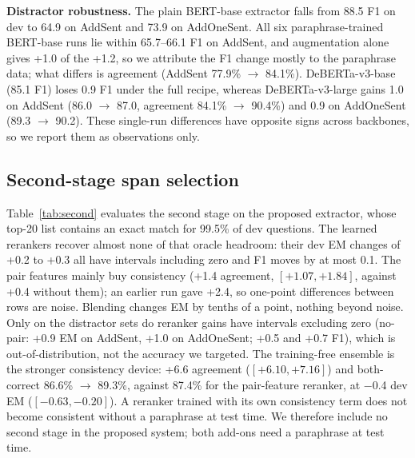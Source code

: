 \documentclass[11pt]{article}
\begin{document}
\textbf{Distractor robustness.} The plain BERT-base extractor falls from 88.5 F1 on dev to 64.9 on AddSent and 73.9 on AddOneSent. All six paraphrase-trained BERT-base runs lie within 65.7--66.1 F1 on AddSent, and augmentation alone gives +1.0 of the +1.2, so we attribute the F1 change mostly to the paraphrase data; what differs is agreement (AddSent 77.9\% $\rightarrow$ 84.1\%). DeBERTa-v3-base (85.1 F1) loses 0.9 F1 under the full recipe, whereas DeBERTa-v3-large gains 1.0 on AddSent (86.0 $\rightarrow$ 87.0, agreement 84.1\% $\rightarrow$ 90.4\%) and 0.9 on AddOneSent (89.3 $\rightarrow$ 90.2). These single-run differences have opposite signs across backbones, so we report them as observations only.



\subsection{Second-stage span selection}
\label{sec:second}
Table~\ref{tab:second} evaluates the second stage on the proposed extractor, whose top-20 list contains an exact match for 99.5\% of dev questions. The learned rerankers recover almost none of that oracle headroom: their dev EM changes of +0.2 to +0.3 all have intervals including zero and F1 moves by at most 0.1. The pair features mainly buy consistency (+1.4 agreement, $[+1.07,+1.84]$, against +0.4 without them); an earlier run gave +2.4, so one-point differences between rows are noise. Blending changes EM by tenths of a point, nothing beyond noise. Only on the distractor sets do reranker gains have intervals excluding zero (no-pair: +0.9 EM on AddSent, +1.0 on AddOneSent; +0.5 and +0.7 F1), which is out-of-distribution, not the accuracy we targeted. The training-free ensemble is the stronger consistency device: +6.6 agreement ($[+6.10,+7.16]$) and both-correct 86.6\% $\rightarrow$ 89.3\%, against 87.4\% for the pair-feature reranker, at $-$0.4 dev EM ($[-0.63,-0.20]$). A reranker trained with its own consistency term does not become consistent without a paraphrase at test time. We therefore include no second stage in the proposed system; both add-ons need a paraphrase at test time.
\end{document}
